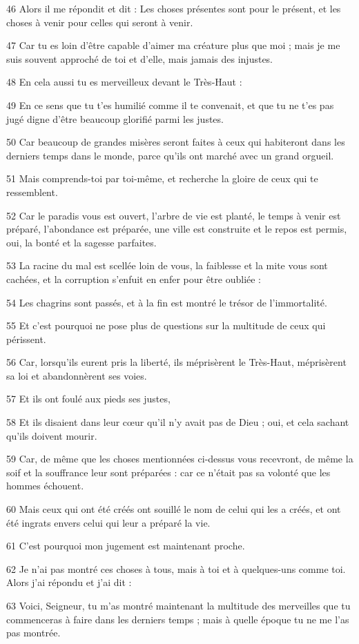 \par 46 Alors il me répondit et dit : Les choses présentes sont pour le présent, et les choses à venir pour celles qui seront à venir.
\par 47 Car tu es loin d'être capable d'aimer ma créature plus que moi ; mais je me suis souvent approché de toi et d'elle, mais jamais des injustes.
\par 48 En cela aussi tu es merveilleux devant le Très-Haut :
\par 49 En ce sens que tu t'es humilié comme il te convenait, et que tu ne t'es pas jugé digne d'être beaucoup glorifié parmi les justes.
\par 50 Car beaucoup de grandes misères seront faites à ceux qui habiteront dans les derniers temps dans le monde, parce qu'ils ont marché avec un grand orgueil.
\par 51 Mais comprends-toi par toi-même, et recherche la gloire de ceux qui te ressemblent.
\par 52 Car le paradis vous est ouvert, l'arbre de vie est planté, le temps à venir est préparé, l'abondance est préparée, une ville est construite et le repos est permis, oui, la bonté et la sagesse parfaites.
\par 53 La racine du mal est scellée loin de vous, la faiblesse et la mite vous sont cachées, et la corruption s'enfuit en enfer pour être oubliée :
\par 54 Les chagrins sont passés, et à la fin est montré le trésor de l'immortalité.
\par 55 Et c'est pourquoi ne pose plus de questions sur la multitude de ceux qui périssent.
\par 56 Car, lorsqu'ils eurent pris la liberté, ils méprisèrent le Très-Haut, méprisèrent sa loi et abandonnèrent ses voies.
\par 57 Et ils ont foulé aux pieds ses justes,
\par 58 Et ils disaient dans leur cœur qu'il n'y avait pas de Dieu ; oui, et cela sachant qu'ils doivent mourir.
\par 59 Car, de même que les choses mentionnées ci-dessus vous recevront, de même la soif et la souffrance leur sont préparées : car ce n'était pas sa volonté que les hommes échouent.
\par 60 Mais ceux qui ont été créés ont souillé le nom de celui qui les a créés, et ont été ingrats envers celui qui leur a préparé la vie.
\par 61 C'est pourquoi mon jugement est maintenant proche.
\par 62 Je n'ai pas montré ces choses à tous, mais à toi et à quelques-uns comme toi. Alors j'ai répondu et j'ai dit :
\par 63 Voici, Seigneur, tu m'as montré maintenant la multitude des merveilles que tu commenceras à faire dans les derniers temps ; mais à quelle époque tu ne me l'as pas montrée.

